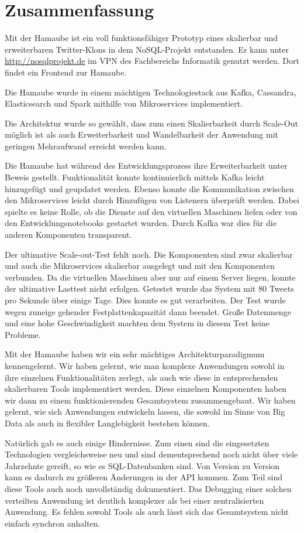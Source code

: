 \chapter{Zusammenfassung}
Mit der Hamaube ist ein voll funktionsfähiger Prototyp eines skalierbar
und erweiterbaren Twitter-Klons in dem NoSQL-Projekt entstanden. Er kann
unter \url{http://nosqlprojekt.de} im VPN des Fachbereichs Informatik genutzt
werden. Dort findet ein Frontend zur Hamaube.

Die Hamaube wurde in einem mächtigen Technologiestack aus Kafka,
Cassandra, Elasticsearch und Spark mithilfe von Mikroservices
implementiert.

Die Architektur wurde so gewählt, dass zum einen Skalierbarkeit durch
Scale-Out möglich ist als auch Erweiterbarkeit und Wandelbarkeit der
Anwendung mit geringen Mehraufwand erreicht werden kann.

Die Hamaube hat während des Entwicklungsprozess ihre Erweiterbarkeit
unter Beweis gestellt. Funktionalität konnte kontinuierlich mittels
Kafka leicht hinzugefügt und geupdatet werden. Ebenso konnte die
Kommunikation zwischen den Mikroservices leicht durch Hinzufügen von
Listenern überprüft werden. Dabei spielte es keine Rolle, ob die
Dienste auf den virtuellen Maschinen liefen oder von den
Entwicklungsnotebooks gestartet wurden. Durch Kafka war dies für die
anderen Komponenten transparent.

Der ultimative Scale-out-Test fehlt noch. Die Komponenten sind zwar
skalierbar und auch die Mikroservices skalierbar ausgelegt und mit den
Komponenten verbunden. Da die virtuellen Maschinen aber nur auf einem
Server liegen, konnte der ultimative Lasttest nicht erfolgen. Getestet
wurde das System mit 80 Tweets pro Sekunde über einige Tage. Dies
konnte es gut verarbeiten. Der Test wurde wegen zuneige gehender
Festplattenkapazität dann beendet. Große Datenmenge und eine hohe
Geschwindigkeit machten dem System in diesem Test keine Probleme.

Mit der Hamaube haben wir ein sehr mächtiges Architekturparadigmum
kennengelernt. Wir haben gelernt, wie man komplexe Anwendungen sowohl
in ihre einzelnen Funktionalitäten zerlegt, als auch wie diese in
entsprechenden skalierbaren Tools implementiert werden. Diese einzelnen
Komponenten haben wir dann zu einem funktionierenden Gesamtsystem
zusammengebaut. Wir haben gelernt, wie sich Anwendungen entwickeln
lassen, die sowohl im Sinne von Big Data als auch in flexibler
Langlebigkeit bestehen können.

Natürlich gab es auch einige Hindernisse. Zum einen sind die
eingesetzten Technologien vergleichsweise neu und sind dementsprechend
noch nicht über viele Jahrzehnte gereift, so wie es SQL-Datenbanken
sind. Von Version zu Version kann es dadurch zu größeren Änderungen in
der API kommen. Zum Teil sind diese Tools auch noch unvollständig
dokumentiert. Das Debugging einer solchen verteilten Anwendung ist 
deutlich komplexer als bei einer zentralisierten Anwendung. Es fehlen
sowohl Tools als auch lässt sich das Gesamtsystem nicht einfach
synchron anhalten.

